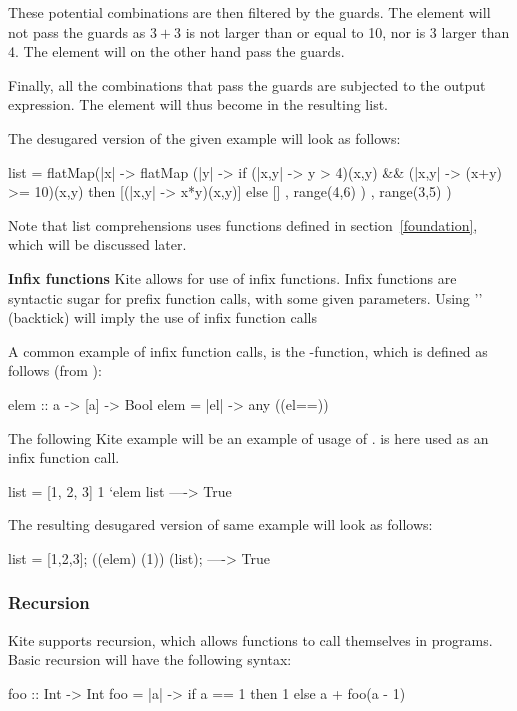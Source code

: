 These potential combinations are then filtered by the guards. The element \code{[3,3]} will not pass the guards as $3+3$ is not larger than or equal to 10, nor is 3 larger than 4. The element \code{[5,5]} will on the other hand pass the guards.

Finally, all the combinations that pass the guards are subjected to the output expression. The element \code{[5,5]} will thus become  in the resulting list.

The desugared version of the given example will look as follows:

\begin{kite}
list =
flatMap(|x| -> {
  flatMap (|y| -> {
    if (|x,y| -> {y > 4})(x,y) && (|x,y| -> {(x+y) >= 10})(x,y)
       then [(|x,y| -> {x*y})(x,y)]
       else []
  } , range(4,6) )
}, range(3,5) )
\end{kite}

Note that list comprehensions uses functions defined in section~\ref{foundation}, which will be discussed later.

\textbf{Infix functions} Kite allows for use of infix functions. Infix functions are syntactic sugar for prefix function calls, with some given parameters. Using '\code{\`}' (backtick) will imply the use of infix function calls

A common example of infix function calls, is the -function, which is defined as follows (from ):
\begin{kite}
elem :: a -> [a] -> Bool
elem = |el| -> {
  any ((el==))
}
\end{kite}

The following Kite example will be an example of usage of .  is here used as an infix function call.
\begin{kite}
list = [1, 2, 3]
1 `elem list ----> True
\end{kite}
The resulting desugared version of same example will look as follows:

\begin{kite}
list = [1,2,3];
((elem) (1)) (list); ----> True
\end{kite}

\subsubsection{Recursion}
Kite supports recursion, which allows functions to call themselves in programs. Basic recursion will have the following syntax:
\begin{kite}
foo :: Int -> Int
foo = |a| -> {
  if a == 1 then 1
  else a + foo(a - 1)
}
\end{kite}

